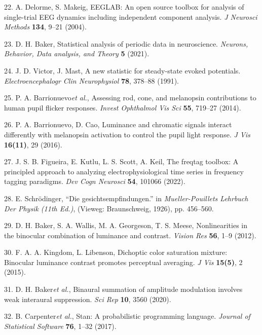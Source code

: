 \documentclass[
]{article}
\begin{document}
\leavevmode\hypertarget{ref-Delorme2004}{}%
22. A. Delorme, S. Makeig, EEGLAB: An open source toolbox for analysis of single-trial EEG dynamics including independent component analysis. \emph{J Neurosci Methods} \textbf{134}, 9--21 (2004).

\leavevmode\hypertarget{ref-Baker2021}{}%
23. D. H. Baker, Statistical analysis of periodic data in neuroscience. \emph{Neurons, Behavior, Data analysis, and Theory} \textbf{5} (2021).

\leavevmode\hypertarget{ref-Victor1991}{}%
24. J. D. Victor, J. Mast, A new statistic for steady-state evoked potentials. \emph{Electroencephalogr Clin Neurophysiol} \textbf{78}, 378--88 (1991).

\leavevmode\hypertarget{ref-Barrionuevo2014}{}%
25. P. A. Barrionuevo\emph{et al.}, Assessing rod, cone, and melanopsin contributions to human pupil flicker responses. \emph{Invest Ophthalmol Vis Sci} \textbf{55}, 719--27 (2014).

\leavevmode\hypertarget{ref-Barrionuevo2016}{}%
26. P. A. Barrionuevo, D. Cao, Luminance and chromatic signals interact differently with melanopsin activation to control the pupil light response. \emph{J Vis} \textbf{16(11)}, 29 (2016).

\leavevmode\hypertarget{ref-Figueira2022}{}%
27. J. S. B. Figueira, E. Kutlu, L. S. Scott, A. Keil, The freqtag toolbox: A principled approach to analyzing electrophysiological time series in frequency tagging paradigms. \emph{Dev Cogn Neurosci} \textbf{54}, 101066 (2022).

\leavevmode\hypertarget{ref-Schrodinger1926}{}%
28. E. Schrödinger, ``Die gesichtsempfindungen.'' in \emph{Mueller-Pouillets Lehrbuch Der Physik (11th Ed.)}, (Vieweg: Braunschweig, 1926), pp. 456--560.

\leavevmode\hypertarget{ref-Baker2012}{}%
29. D. H. Baker, S. A. Wallis, M. A. Georgeson, T. S. Meese, Nonlinearities in the binocular combination of luminance and contrast. \emph{Vision Res} \textbf{56}, 1--9 (2012).

\leavevmode\hypertarget{ref-Kingdom2015}{}%
30. F. A. A. Kingdom, L. Libenson, Dichoptic color saturation mixture: Binocular luminance contrast promotes perceptual averaging. \emph{J Vis} \textbf{15(5)}, 2 (2015).

\leavevmode\hypertarget{ref-Baker2020}{}%
31. D. H. Baker\emph{et al.}, Binaural summation of amplitude modulation involves weak interaural suppression. \emph{Sci Rep} \textbf{10}, 3560 (2020).

\leavevmode\hypertarget{ref-Carpenter2017}{}%
32. B. Carpenter\emph{et al.}, Stan: A probabilistic programming language. \emph{Journal of Statistical Software} \textbf{76}, 1--32 (2017).
\end{document}
